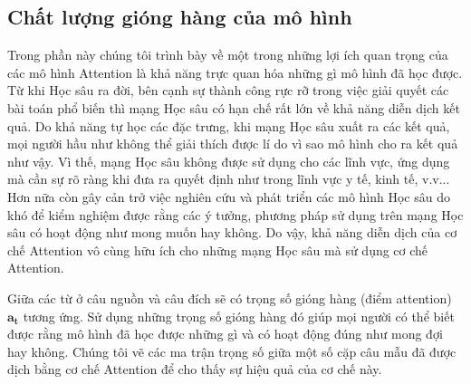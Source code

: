 \subsection{Chất lượng gióng hàng của mô hình}
Trong phần này chúng tôi trình bày về một trong những lợi ích quan trọng của các mô hình Attention là khả năng trực quan hóa những gì mô hình đã học được. Từ khi Học sâu ra đời, bên cạnh sự thành công rực rỡ trong việc giải quyết các bài toán phổ biến thì mạng Học sâu có hạn chế rất lớn về khả năng diễn dịch kết quả. Do khả năng tự học các đặc trưng, khi mạng Học sâu xuất ra các kết quả, mọi người hầu như không thể giải thích được lí do vì sao mô hình cho ra kết quả như vậy. Vì thế, mạng Học sâu không được sử dụng cho các lĩnh vực, ứng dụng mà cần sự rõ ràng khi đưa ra quyết định như trong lĩnh vực y tế, kinh tế, v.v... Hơn nữa còn gây cản trở việc nghiên cứu và phát triển các mô hình Học sâu do khó để kiểm nghiệm được rằng các ý tưởng, phương pháp sử dụng trên mạng Học sâu có hoạt động như mong muốn hay không. Do vậy, khả năng diễn dịch của cơ chế Attention vô cùng hữu ích cho những mạng Học sâu mà sử dụng cơ chế Attention.

Giữa các từ ở câu nguồn và câu đích sẽ có trọng số gióng hàng (điểm attention) $\bm{a_t}$ tương ứng. Sử dụng những trọng số gióng hàng đó giúp mọi người có thể biết được rằng mô hình đã học được những gì và có hoạt động đúng như mong đợi hay không. Chúng tôi vẽ các ma trận trọng số giữa một số cặp câu mẫu đã được dịch bằng cơ chế Attention để cho thấy sự hiệu quả của cơ chế này.